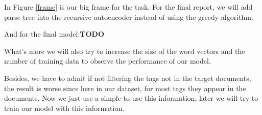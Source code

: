 \documentclass[dvips,9pt]{article}
\begin{document}
    In Figure \ref{frame} is our big frame for the task. For the final report, we will add parse tree into the recursive autoencoder instead of using the greedy algorithm.
    
    And for the final model:\textbf{TODO}
    
    What's more we will also try to increase the size of the word vectors and the number of training data to observe the performance of our model.
    
    Besides, we have to admit if not filtering the tags not in the target documents, the result is worse since here in our dataset, for most tags they appear in the documents. Now we just use a simple to use this information, later we will try to train our model with this information.
	
	
\end{document}
